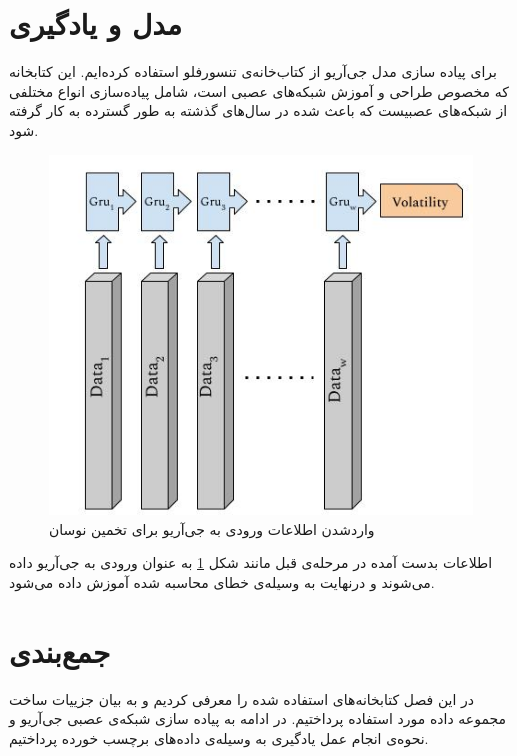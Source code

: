 \section{مدل و یادگیری}
برای پیاده سازی مدل جی‌آریو از کتاب‌خانه‌ی تنسورفلو استفاده کرده‌ایم. این کتابخانه که مخصوص طراحی و آموزش شبکه‌های عصبی است، شامل پیاده‌سازی انواع مختلفی از شبکه‌های عصبیست که باعث شده در سال‌های گذشته به طور گسترده به کار گرفته شود.\\
\begin{figure}[!t]
	\includegraphics[width=0.6 \textwidth]{images/gru_function}
	\centering
	\caption{واردشدن اطلاعات ورودی به جی‌آریو برای تخمین نوسان}
	\label{fig.gru_function}
\end{figure}
\newpage
اطلاعات بدست آمده در مرحله‌ی قبل مانند شکل \ref{fig.gru_function} به عنوان ورودی به جی‌آریو داده می‌شوند و درنهایت به وسیله‌ی خطای محاسبه‌ شده آموزش داده می‌شود.
\section{جمع‌بندی}
در این فصل کتابخانه‌های استفاده شده را معرفی کردیم و به بیان جزییات ساخت مجموعه داده مورد استفاده پرداختیم. در ادامه به پیاده سازی شبکه‌ی عصبی جی‌آریو و نحوه‌ی انجام عمل یادگیری به وسیله‌ی داده‌های برچسب خورده پرداختیم.






